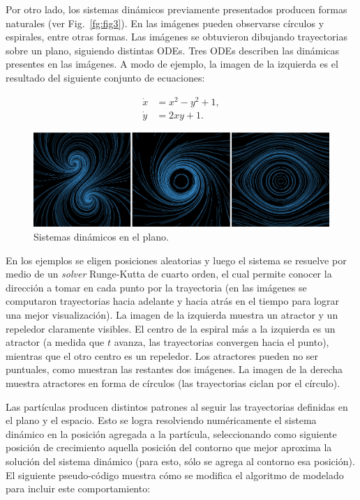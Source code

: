 \documentclass[spanish,a4paper,11pt,oneside,links]{report}
\begin{document}
Por otro lado, los sistemas din\'amicos previamente presentados producen formas naturales (ver Fig.~\ref{fg:fig3}). En las im\'agenes pueden observarse c\'irculos y espirales, entre otras formas. Las im\'agenes se obtuvieron dibujando trayectorias sobre un plano, siguiendo distintas ODEs. Tres ODEs describen las din\'amicas presentes en las im\'agenes. A modo de ejemplo, la imagen de la izquierda es el resultado del siguiente conjunto de ecuaciones:

\begin{equation} \label{eq:simple}  
  \begin{aligned}
    \dot{x} &= x^{2}-y^{2}+1,\\
    \dot{y} &= 2xy+1.
  \end{aligned}
\end{equation}


\begin{figure}[htb!]
  \centerline{\includegraphics[scale=0.28]{sistdin2}}
  \caption{Sistemas din\'amicos en el plano.}
  \label{fg:sistdin2}
\end{figure}

En los ejemplos se eligen posiciones aleatorias y luego el sistema se resuelve por medio de un {\em solver} Runge-Kutta de cuarto orden, el cual permite conocer la direcci\'on a tomar en cada punto por la trayectoria (en las im\'agenes se computaron trayectorias hacia adelante y hacia atrás en el tiempo para lograr una mejor visualizaci\'on). La imagen de la izquierda muestra un atractor y un repeledor claramente visibles. El centro de la espiral m\'as a la izquierda es un atractor (a medida que $t$ avanza, las trayectorias convergen hacia el punto), mientras que el otro centro es un repeledor. Los atractores pueden no ser puntuales, como muestran las restantes dos im\'agenes. La imagen de la derecha muestra atractores en forma de c\'irculos (las trayectorias ciclan por el c\'irculo).

Las part\'iculas producen distintos patrones al seguir las trayectorias definidas en el plano y el espacio. Esto se logra resolviendo num\'ericamente el sistema din\'amico en la posici\'on agregada a la part\'icula, seleccionando como siguiente posici\'on de crecimiento aquella posici\'on del contorno que mejor aproxima la soluci\'on del sistema din\'amico (para esto, sólo se agrega al contorno esa posición). El siguiente pseudo-código muestra cómo se modifica el algoritmo de modelado para incluir este comportamiento:
\end{document}
